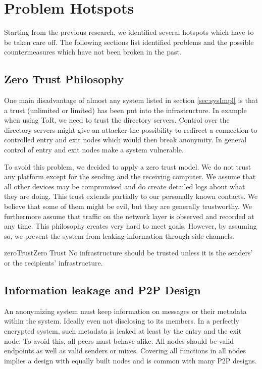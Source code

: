 \section{Problem Hotspots}
Starting from the previous research, we identified several hotspots which have to be taken care off. The following sections list identified problems and the possible countermeasures which have not been broken in the past.

\subsection{Zero Trust Philosophy}
One main disadvantage of almost any system listed in section \ref{sec:sysImpl} is that a trust (unlimited or limited) has been put into the infrastructure. In example when using ToR, we need to trust the directory servers. Control over the directory servers might give an attacker the possibility to redirect a connection to controlled entry and exit nodes which would then break anonymity. In general control of entry and exit nodes make a system vulnerable. 

To avoid this problem, we decided to apply a zero trust model. We do not trust any platform except for the sending and the receiving computer. We assume that all other devices may be compromised and do create detailed logs about what they are doing. This trust extends partially to our personally known contacts. We believe that some of them might be evil, but they are generally trustworthy. We furthermore assume that traffic on the network layer is observed and recorded at any time. This philosophy creates very hard to meet goals. However, by assuming so, we prevent the system from leaking information through side channels.

\begin{requirement}{zeroTrust}{Zero Trust}
    No infrastructure should be trusted unless it is the senders' or the recipients' infrastructure.
\end{requirement}	

\subsection{Information leakage and P2P Design}
An anonymizing system must keep information on messages or their metadata within the system. Ideally even not disclosing to its members. In a perfectly encrypted system, such metadata is leaked at least by the entry and the exit node. To avoid this, all peers must behave alike. All nodes should be valid endpoints as well as valid senders or mixes. Covering all functions in all nodes implies a design with equally built nodes and is common with many P2P designs.

